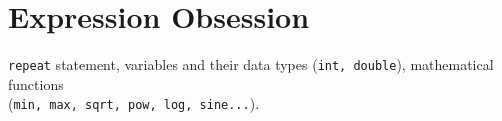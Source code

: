 \documentclass[../../Problems]{subfiles}
\begin{document}
\section{Expression Obsession}{\label{sec:expressionobsession}}
\begin{topics}
\verb!repeat! statement, variables and their data types (\verb!int, double!), mathematical functions \\(\verb!min, max, sqrt, pow, log, sine...!).
\end{topics}










\end{document}
